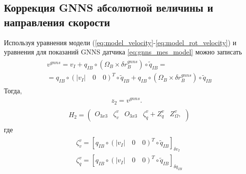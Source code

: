\documentclass[a4paper,12pt]{article}
\begin{document}
\subsection{Коррекция GNNS абсолютной величины и направления скорости}
Используя уравнения модели (\ref{eq:model_velocity}-\ref{eq:model_rot_velocity}) и уравнения для показаний GNNS датчика \eqref{eq:gnns_mes_model} можно записать
\begin{align}
\begin{split}
&v^{gnns} = v_I + q_{IB} \circ  (\Omega_B \times \delta r^{gnns}_B) \circ \tilde{q}_{IB} = \\
& = q_{IB} \circ (|v_I| \quad 0 \quad 0)^T \circ \tilde{q}_{IB} + q_{IB} \circ  (\Omega_B \times \delta r^{gnns}_B) \circ \tilde{q}_{IB}
\end{split}
\end{align}
Тогда, 
\begin{align}
z_2 = v^{gnns}.
\end{align}
\begin{align}
\begin{split}
&H_2 =
\begin{pmatrix}
O_{3x3} & \zeta^v_v & O_{3x3} & \zeta^v_q + Z^v_q & Z^v_{\Omega},
\end{pmatrix}
\end{split}
\end{align}
где
\begin{align}
\begin{split}
&\zeta^v_v = [q_{IB} \circ (|v_I| \quad 0 \quad 0)^T \circ \tilde{q}_{IB}]_{\delta v_I} \\
&\zeta^v_q = [q_{IB} \circ (|v_I| \quad 0 \quad 0)^T \circ \tilde{q}_{IB}]_{\delta q_{IB}}
\end{split}
\end{align}
\end{document}
